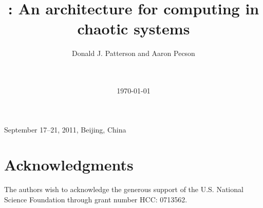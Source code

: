 \documentclass{chi2008}
\title{\Cacophony: An architecture for computing in chaotic systems}
\author{
\alignauthor
Donald J. Patterson and Aaron Pecson\\
       \affaddr{Department of Informatics}\\
       \affaddr{University of California, Irvine, USA}\\
       \email{ \{djp3,apecson\}@uci.edu}
}
\begin{document}
 {September 17--21, 2011, Beijing, China} 





\date{\today}

\maketitle







\section{Acknowledgments}
The authors wish to acknowledge the generous support of the U.S. National
Science Foundation through grant number HCC: 0713562.



\balancecolumns
\end{document}
